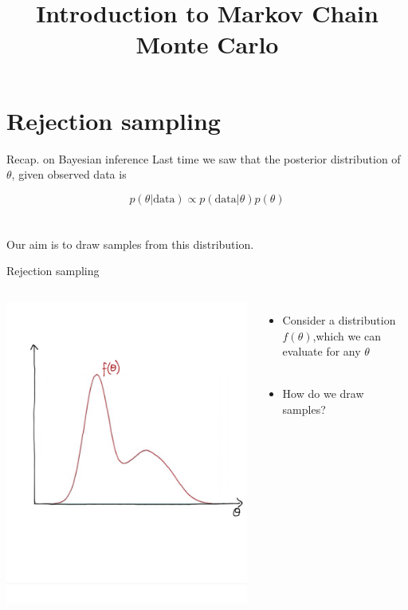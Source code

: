 \documentclass[compress]{beamer}
\title{Introduction to Markov Chain Monte Carlo}
\date{}
\begin{document}
    \begin{frame}
        \titlepage
    \end{frame}

    \section{Rejection sampling}
    \label{sec-5}
    \begin{frame}[label=sec-5-1]{Recap. on Bayesian inference}
        Last time we saw that the \alert{posterior distribution} of $\theta$, given observed data is

        $$ p(\theta | \text{data}) \propto p(\text{data}|\theta) p(\theta)$$\\~\\

        Our aim is to draw samples from this distribution.
    \end{frame}

    \begin{frame}[label=sec-5-2]{Rejection sampling}
        \begin{columns}[c] 
        \includegraphics[width=1\linewidth]{RS1}

        \begin{itemize}
            \item Consider a distribution $f(\theta)$,which we can evaluate for any $\theta$\\~\\
            \item How do we draw samples?
        \end{itemize}
    \end{columns}
\end{frame}
\end{document}
